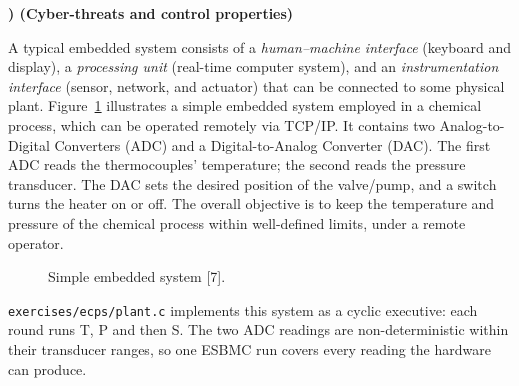 \documentclass[11pt,a4paper]{article}
\newcommand{\esbmc}{ESBMC}
\newcommand{\file}[1]{\texttt{\small #1}}
\newcounter{exc}
\newenvironment{exercise}[1]
  {\stepcounter{exc}\medskip\noindent\textbf{\theexc) (#1)}\par\nopagebreak\smallskip}
  {\par\medskip}
\begin{document}
\begin{exercise}{Cyber-threats and control properties}
A typical embedded system consists of a \emph{human--machine interface}
(keyboard and display), a \emph{processing unit} (real-time computer system),
and an \emph{instrumentation interface} (sensor, network, and actuator) that can
be connected to some physical plant. Figure~\ref{fig:plant} illustrates a simple
embedded system employed in a chemical process, which can be operated remotely
via TCP/IP. It contains two Analog-to-Digital Converters (ADC) and a
Digital-to-Analog Converter (DAC). The first ADC reads the thermocouples'
temperature; the second reads the pressure transducer. The DAC sets the desired
position of the valve/pump, and a switch turns the heater on or off. The overall
objective is to keep the temperature and pressure of the chemical process within
well-defined limits, under a remote operator.

\begin{figure}[htbp]
\centering
{}
\caption{Simple embedded system [7].}
\label{fig:plant}
\end{figure}

\file{exercises/ecps/plant.c} implements this system as a cyclic executive: each
round runs T, P and then S. The two ADC readings are non-deterministic within
their transducer ranges, so one \esbmc{} run covers every reading the hardware
can produce.


\end{exercise}
\end{document}
